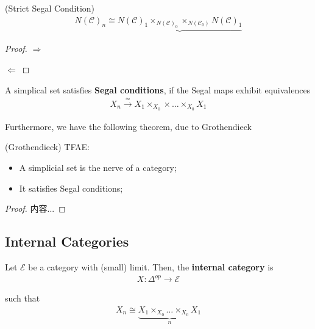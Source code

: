 \documentclass[Total.tex]{subfiles}
\begin{document}
			\begin{proposition}
				(Strict Segal Condition) 
				\begin{gather*}
					N(\mathcal{C})_n\cong\underbrace{ N(\mathcal{C})_1\times_{N(\mathcal{C})_0}\times_{N(\mathcal{C}_0)} N(\mathcal{C})_1}
				\end{gather*}
			\end{proposition}
			\begin{proof}
				$\Rightarrow$ 
				
				$\Leftarrow$ 
			\end{proof}
			
			\begin{Def}
				A simplical set satisfies \textbf{Segal conditions}, if the Segal maps exhibit equivalences
				\begin{gather*}
					X_n\stackrel{\simeq}{\rightarrow} X_1\times_{X_0}\times\dots\times_{X_0} X_1
				\end{gather*}
			\end{Def}
			
			Furthermore, we have the following theorem, due to Grothendieck
			\begin{theorem}
				(Grothendieck) TFAE:
				\begin{itemize}
					\item A simplicial set is the nerve of a category;
					\item It satisfies Segal conditions;
				\end{itemize}
			\end{theorem}
			\begin{proof}
				内容...
			\end{proof}
			
			\subsection{Internal Categories}
			\begin{Def}
				Let $\mathcal{E}$ be a category with (small) limit. Then, the \textbf{internal category} is 
				\begin{gather*}
					X:\Delta^{op}\rightarrow\mathcal{E}
				\end{gather*}
				
				such that
				\begin{gather*}
					X_n\cong \underbrace{X_1\times_{X_0}\dots\times_{X_0} X_1}_n
				\end{gather*}
			\end{Def}
			
\end{document}
